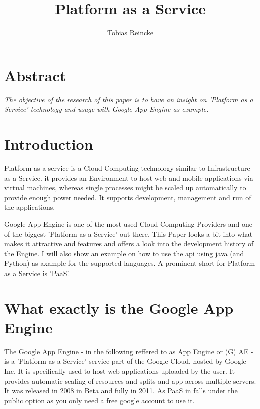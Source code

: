 \documentclass{article}
\title{Platform as a Service}
\author{Tobias Reincke}
\begin{document}
\maketitle

\section{Abstract}
\textit{The objective of the research of this paper is to have an insight on 'Platform as a Service' technology and usage with Google App Engine as example.}
\tableofcontents
\section{Introduction}
Platform as a service is a Cloud Computing technology similar to Infrastructure as a Service. it provides an Environment to host web and mobile applications via virtual machines, whereas single processes might be scaled up automatically to provide enough power needed. It supports development, management and run of the applications.

Google App Engine is one of the most used Cloud Computing Providers and one of the biggest 'Platform as a Service' out there. This Paper looks a bit into what makes it attractive and features and offers a look into the development history of the Engine. I will also show an example on how to use the api using java (and Python) as axample for the supported languages. A prominent short for Platform as a Service is 'PaaS'.

\section{What exactly is the Google App Engine}
The Google App Engine - in the following  reffered to as App Engine or (G) AE - is a 'Platform as a Service'-service part of the Google Cloud, hosted by Google Inc. It is specifically used to host web applications uploaded by the user. It provides automatic scaling of resources and splits and app across multiple servers. It was released in 2008 in Beta and fully in 2011.  As PaaS in falls under the public option as you only need a free google account to use it.
\end{document}

